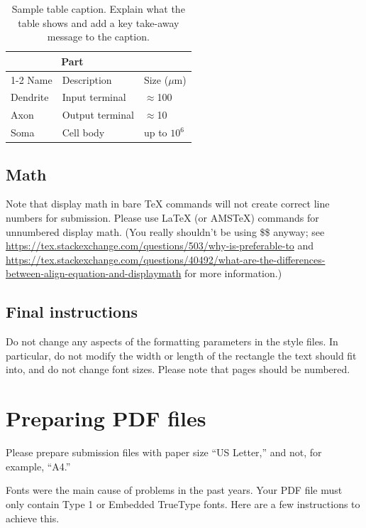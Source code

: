 \documentclass{article}
\begin{document}
\begin{table}
  \caption{Sample table caption. Explain what the table shows and add a key take-away message to the caption.}
  \label{sample-table}
  \centering
  \begin{tabular}{lll}
    \toprule
    \multicolumn{2}{c}{Part}                   \\
    \cmidrule(r){1-2}
    Name     & Description     & Size ($\mu$m) \\
    \midrule
    Dendrite & Input terminal  & $\approx$100     \\
    Axon     & Output terminal & $\approx$10      \\
    Soma     & Cell body       & up to $10^6$  \\
    \bottomrule
  \end{tabular}
\end{table}

\subsection{Math}
Note that display math in bare TeX commands will not create correct line numbers for submission. Please use LaTeX (or AMSTeX) commands for unnumbered display math. (You really shouldn't be using \$\$ anyway; see \url{https://tex.stackexchange.com/questions/503/why-is-preferable-to} and \url{https://tex.stackexchange.com/questions/40492/what-are-the-differences-between-align-equation-and-displaymath} for more information.)

\subsection{Final instructions}

Do not change any aspects of the formatting parameters in the style files.  In
particular, do not modify the width or length of the rectangle the text should
fit into, and do not change font sizes. Please note that pages should be
numbered.


\section{Preparing PDF files}


Please prepare submission files with paper size ``US Letter,'' and not, for
example, ``A4.''


Fonts were the main cause of problems in the past years. Your PDF file must only
contain Type 1 or Embedded TrueType fonts. Here are a few instructions to
achieve this.
\end{document}
